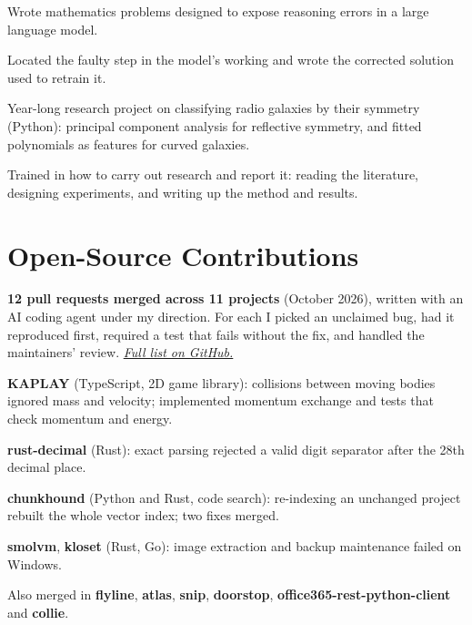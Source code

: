 \begin{bullets}
  \item Wrote mathematics problems designed to expose reasoning errors in a large language model.
  \item Located the faulty step in the model's working and wrote the corrected solution used to
        retrain it.
\end{bullets}
\gap

\begin{bullets}
  \item Year-long research project on classifying radio galaxies by their symmetry (Python):
        principal component analysis for reflective symmetry, and fitted polynomials as features
        for curved galaxies.
  \item Trained in how to carry out research and report it: reading the literature, designing
        experiments, and writing up the method and results.
\end{bullets}

\section{Open-Source Contributions}
\textbf{12 pull requests merged across 11 projects} (October 2026), written with an AI coding agent
under my direction. For each I picked an unclaimed bug, had it reproduced first, required a test
that fails without the fix, and handled the maintainers' review.
\href{https://github.com/pulls?q=is\%3Apr+author\%3AWynandVStaden+is\%3Amerged}{\textit{Full list on GitHub.}}
\begin{bullets}
  \item \textbf{KAPLAY} (TypeScript, 2D game library): collisions between moving bodies ignored mass
        and velocity; implemented momentum exchange and tests that check momentum and energy.
  \item \textbf{rust-decimal} (Rust): exact parsing rejected a valid digit separator after the 28th
        decimal place.
  \item \textbf{chunkhound} (Python and Rust, code search): re-indexing an unchanged project rebuilt
        the whole vector index; two fixes merged.
  \item \textbf{smolvm}, \textbf{kloset} (Rust, Go): image extraction and backup maintenance failed
        on Windows.
  \item Also merged in \textbf{flyline}, \textbf{atlas}, \textbf{snip}, \textbf{doorstop},
        \textbf{office365-rest-python-client} and \textbf{collie}.
\end{bullets}

